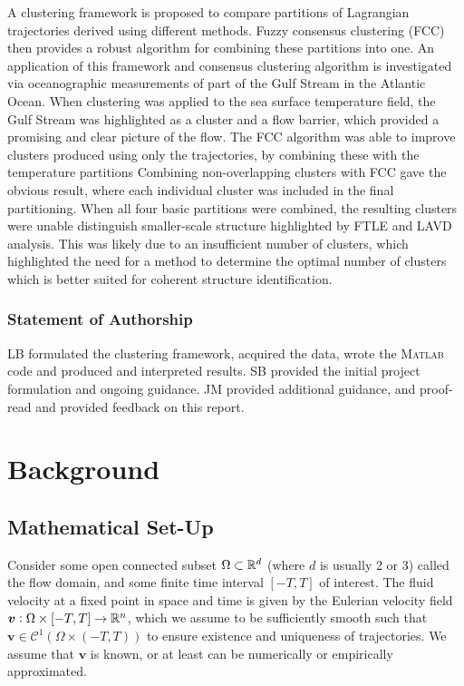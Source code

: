 \documentclass[a4paper, fontsize=12pt]{article}
\begin{document}
A clustering framework is proposed to compare partitions of Lagrangian trajectories derived using different methods. Fuzzy consensus clustering (FCC) then provides a robust algorithm for combining these partitions into one. An application of this framework and consensus clustering algorithm is investigated via oceanographic measurements of part of the Gulf Stream in the Atlantic Ocean. When clustering was applied to the sea surface temperature field, the Gulf Stream was highlighted as a cluster and a flow barrier, which provided a promising and clear picture of the flow. The FCC algorithm was able to improve clusters produced using only the trajectories, by combining these with the temperature partitions Combining non-overlapping clusters with FCC gave the obvious result, where each individual cluster was included in the final partitioning. When all four basic partitions were combined, the resulting clusters were unable distinguish smaller-scale structure highlighted by FTLE and LAVD analysis. This was likely due to an insufficient number of clusters, which highlighted the need for a method to determine the optimal number of clusters which is better suited for coherent structure identification. 


 



\subsubsection*{Statement of Authorship}
LB formulated the clustering framework, acquired the data, wrote the \textsc{Matlab} code and produced and interpreted results. SB provided the initial project formulation and ongoing guidance. JM provided additional guidance, and proof-read and provided feedback on this report.


\section{Background}
\subsection{Mathematical Set-Up}
Consider some open connected subset \(\Omega \subset \mathbb{R}^d\) (where \(d\) is usually 2 or 3) called the flow domain, and some finite time interval \([-T,T]\) of interest. The fluid velocity at a fixed point in space and time is given by the Eulerian velocity field \(\bm{v}:\Omega\times[-T,T] \to \mathbb{R}^n\), which we assume to be sufficiently smooth such that \(\bm{v} \in \mathcal{C}^1(\Omega\times(-T,T))\) to ensure existence and uniqueness of trajectories. We assume that \(\bm{v}\) is known, or at least can be numerically or empirically approximated.
\end{document}
